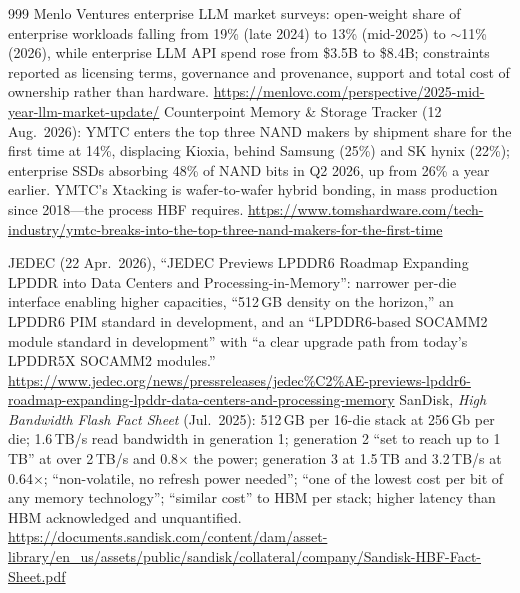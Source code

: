 \begin{thebibliography}{999}
 Menlo Ventures enterprise LLM market surveys: open-weight share of enterprise workloads falling from 19\% (late 2024) to 13\% (mid-2025) to $\sim$11\% (2026), while enterprise LLM API spend rose from \$3.5B to \$8.4B; constraints reported as licensing terms, governance and provenance, support and total cost of ownership rather than hardware. \url{https://menlovc.com/perspective/2025-mid-year-llm-market-update/}
 Counterpoint Memory \& Storage Tracker (12 Aug.\ 2026): YMTC enters the top three NAND makers by shipment share for the first time at 14\%, displacing Kioxia, behind Samsung (25\%) and SK hynix (22\%); enterprise SSDs absorbing 48\% of NAND bits in Q2 2026, up from 26\% a year earlier. YMTC's Xtacking is wafer-to-wafer hybrid bonding, in mass production since 2018---the process HBF requires. \url{https://www.tomshardware.com/tech-industry/ymtc-breaks-into-the-top-three-nand-makers-for-the-first-time}


 JEDEC (22 Apr.\ 2026), ``JEDEC Previews LPDDR6 Roadmap Expanding LPDDR into Data Centers and Processing-in-Memory'': narrower per-die interface enabling higher capacities, ``512\,GB density on the horizon,'' an LPDDR6 PIM standard in development, and an ``LPDDR6-based SOCAMM2 module standard in development'' with ``a clear upgrade path from today's LPDDR5X SOCAMM2 modules.'' \url{https://www.jedec.org/news/pressreleases/jedec%C2%AE-previews-lpddr6-roadmap-expanding-lpddr-data-centers-and-processing-memory}
 SanDisk, \emph{High Bandwidth Flash Fact Sheet} (Jul.\ 2025): 512\,GB per 16-die stack at 256\,Gb per die; 1.6\,TB/s read bandwidth in generation 1; generation 2 ``set to reach up to 1\,TB'' at over 2\,TB/s and 0.8$\times$ the power; generation 3 at 1.5\,TB and 3.2\,TB/s at 0.64$\times$; ``non-volatile, no refresh power needed''; ``one of the lowest cost per bit of any memory technology''; ``similar cost'' to HBM per stack; higher latency than HBM acknowledged and unquantified. \url{https://documents.sandisk.com/content/dam/asset-library/en_us/assets/public/sandisk/collateral/company/Sandisk-HBF-Fact-Sheet.pdf}



\end{thebibliography}
